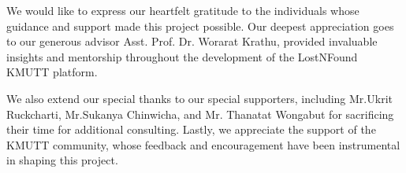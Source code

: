 \begin{acknowledgements}
\par
We would like to express our heartfelt gratitude to the individuals whose guidance and support made this project possible. Our deepest appreciation goes to our generous advisor  Asst. Prof. Dr. Worarat Krathu, provided invaluable insights and mentorship throughout the development of the LostNFound KMUTT platform.

We also extend our special thanks to our special supporters, including Mr.Ukrit Ruckcharti, Mr.Sukanya Chinwicha, and Mr. Thanatat Wongabut for sacrificing their time for additional consulting. Lastly, we appreciate the support of the KMUTT community, whose feedback and encouragement have been instrumental in shaping this project.
\end{acknowledgements}